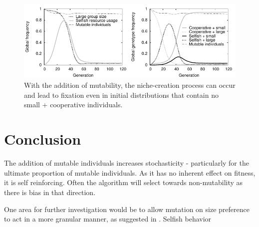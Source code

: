 \documentclass[11pt]{article}
\begin{document}
\begin{figure}[!ht]
  \centering
  \includegraphics{120geninteresting.pdf}
  \caption{With the addition of mutability, the niche-creation process can occur and lead to fixation even in initial distributions that contain no small + cooperative individuals.}
  \label{fig:120geninteresting}
\end{figure}

\section{Conclusion}
The addition of mutable individuals increases stochasticity - particularly for the ultimate proportion of mutable individuals. As it has no inherent effect on fitness, it is self reinforcing. Often the algorithm will select towards non-mutability as there is bias in that direction.

One area for further investigation would be to allow mutation on size preference to act in a more granular manner, as suggested in \citet{thesis}. Selfish behavior

\newpage

{}

\newpage
\appendix
\end{document}

